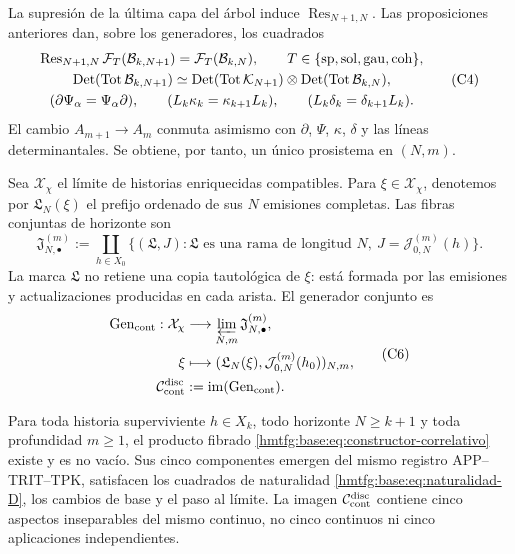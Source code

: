 La supresión de la última capa del árbol induce
\(\operatorname{Res}_{N+1,N}\). Las proposiciones anteriores dan, sobre los
generadores, los cuadrados
\[
\begin{gathered}
 \operatorname{Res}_{N+1,N}\mathcal F_T(\mathcal B_{k,N+1})
 =\mathcal F_T(\mathcal B_{k,N}),
 \qquad T\in\{{\rm sp},{\rm sol},{\rm gau},{\rm coh}\},\\
 \operatorname{Det}(\operatorname{Tot}\mathcal B_{k,N+1})
 \simeq
 \operatorname{Det}(\operatorname{Tot}\mathcal K_{N+1})
 \otimes
 \operatorname{Det}(\operatorname{Tot}\mathcal B_{k,N}),\\
 (\partial\Psi_\alpha=\Psi_\alpha\partial),\qquad
 (L_k\kappa_k=\kappa_{k+1}L_k),\qquad
 (L_k\delta_k=\delta_{k+1}L_k).
\end{gathered}
 \tag{C4}
 \label{hmtfg:base:eq:naturalidad-D}
\]
El cambio \(A_{m+1}\to A_m\) conmuta asimismo con \(\partial\), \(\Psi\),
\(\kappa\), \(\delta\) y las líneas determinantales. Se obtiene, por tanto,
un único prosistema en \((N,m)\).

Sea \(\mathcal X_\chi\) el límite de historias enriquecidas compatibles. Para
\(\xi\in\mathcal X_\chi\), denotemos por \(\mathfrak L_N(\xi)\) el prefijo
ordenado de sus \(N\) emisiones completas. Las fibras conjuntas de horizonte
son
\[
 \mathfrak J_{N,\bullet}^{(m)}
 :=\coprod_{h\in X_0}
 \{(\mathfrak L,J):\mathfrak L\text{ es una rama de longitud }N,
       \ J=\mathcal J_{0,N}^{(m)}(h)\}.
 \tag{C5}
 \label{hmtfg:base:eq:fibras-conjuntas-horizonte}
\]
La marca \(\mathfrak L\) no retiene una copia tautológica de \(\xi\): está
formada por las emisiones y actualizaciones producidas en cada arista. El
generador conjunto es
\[
\begin{aligned}
 \operatorname{Gen}_{\rm cont}:\mathcal X_\chi
   &\longrightarrow\varprojlim_{N,m}\mathfrak J_{N,\bullet}^{(m)},\\
 \xi&\longmapsto
   (\mathfrak L_N(\xi),\mathcal J_{0,N}^{(m)}(h_0))_{N,m},\\
 \mathcal C_{\rm cont}^{\rm disc}
   &:=\operatorname{im}(\operatorname{Gen}_{\rm cont}).
\end{aligned}
 \tag{C6}
 \label{hmtfg:base:eq:continuo-discreto}
\]

\begin{theorem}
\label{hmtfg:base:thm:correlacion-cinco}
Para toda historia superviviente \(h\in X_k\), todo horizonte
\(N\geq k+1\) y toda profundidad \(m\geq1\), el producto fibrado
\eqref{hmtfg:base:eq:constructor-correlativo} existe y es no vacío. Sus cinco
componentes emergen del mismo registro APP--TRIT--TPK, satisfacen los
cuadrados de naturalidad \eqref{hmtfg:base:eq:naturalidad-D}, los cambios de base y el
paso al límite. La imagen \(\mathcal C_{\rm cont}^{\rm disc}\) contiene cinco
aspectos inseparables del mismo continuo, no cinco continuos ni cinco
aplicaciones independientes.
\end{theorem}

